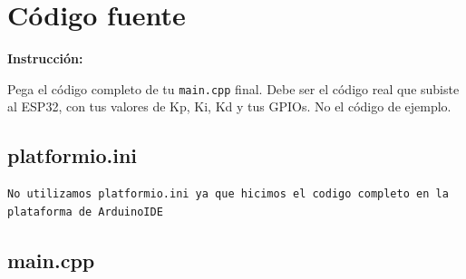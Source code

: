 \documentclass[11pt, letterpaper]{article}
\newenvironment{instruccion}{%
  \begin{mdframed}[backgroundcolor=tealLight,linecolor=tealMain,linewidth=1pt,
    innerleftmargin=10pt,innerrightmargin=10pt,
    innertopmargin=6pt,innerbottommargin=6pt]
  \small\textbf{\color{tealMain}Instrucci\'on:}\hspace{4pt}
}{\end{mdframed}}
\begin{document}
\section{Código fuente}

\begin{instruccion}
  Pega el c\'odigo completo de tu \texttt{main.cpp} final.
  Debe ser el c\'odigo real que subiste al ESP32, con tus
  valores de Kp, Ki, Kd y tus GPIOs. No el c\'odigo de ejemplo.
\end{instruccion}

\subsection{platformio.ini}

\begin{lstlisting}[caption={platformio.ini del proyecto}]
No utilizamos platformio.ini ya que hicimos el codigo completo en la plataforma de ArduinoIDE
\end{lstlisting}

\subsection{main.cpp}
\end{document}
